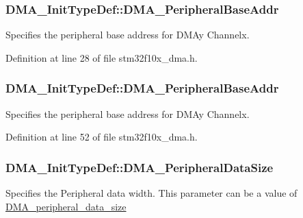 \subsubsection[{\texorpdfstring{D\+M\+A\+\_\+\+Peripheral\+Base\+Addr}{DMA_PeripheralBaseAddr}}]{ D\+M\+A\+\_\+\+Init\+Type\+Def\+::\+D\+M\+A\+\_\+\+Peripheral\+Base\+Addr}\hypertarget{struct_d_m_a___init_type_def_a9721c2839c7744899a3297b3e9bf623e}{}\label{struct_d_m_a___init_type_def_a9721c2839c7744899a3297b3e9bf623e}
Specifies the peripheral base address for D\+M\+Ay Channelx. 

Definition at line 28 of file stm32f10x\+\_\+dma.\+h.

\subsubsection[{\texorpdfstring{D\+M\+A\+\_\+\+Peripheral\+Base\+Addr}{DMA_PeripheralBaseAddr}}]{ D\+M\+A\+\_\+\+Init\+Type\+Def\+::\+D\+M\+A\+\_\+\+Peripheral\+Base\+Addr}\hypertarget{struct_d_m_a___init_type_def_a232af556de7c2eec9a82d448730bd86d}{}\label{struct_d_m_a___init_type_def_a232af556de7c2eec9a82d448730bd86d}
Specifies the peripheral base address for D\+M\+Ay Channelx. 

Definition at line 52 of file stm32f10x\+\_\+dma.\+h.

\subsubsection[{\texorpdfstring{D\+M\+A\+\_\+\+Peripheral\+Data\+Size}{DMA_PeripheralDataSize}}]{ D\+M\+A\+\_\+\+Init\+Type\+Def\+::\+D\+M\+A\+\_\+\+Peripheral\+Data\+Size}\hypertarget{struct_d_m_a___init_type_def_a4419f4e44f37a950ab35a1d0cc9c4b5c}{}\label{struct_d_m_a___init_type_def_a4419f4e44f37a950ab35a1d0cc9c4b5c}
Specifies the Peripheral data width. This parameter can be a value of \hyperlink{group___d_m_a__peripheral__data__size}{D\+M\+A\+\_\+peripheral\+\_\+data\+\_\+size} 

